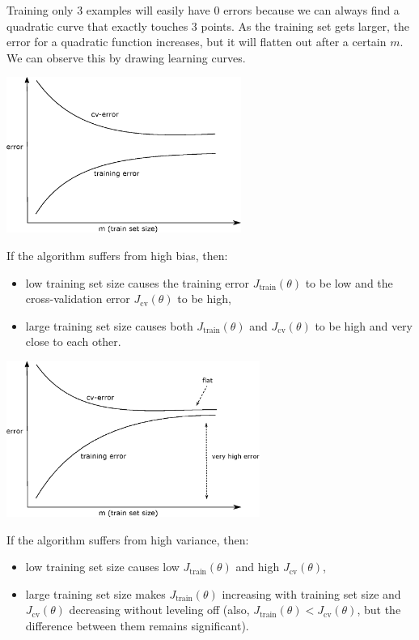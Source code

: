 \documentclass[a4paper,11pt]{report}
\begin{document}
Training only 3 examples will easily have 0 errors because we can always find a quadratic curve that exactly touches 3 points. As the training set gets larger, the error for a quadratic function increases, but it will flatten  out after a certain $m$. We can observe this by drawing learning curves.
\begin{center}
\includegraphics[height = 2in]{Images/learn_curve}
\end{center}

If the algorithm suffers from high bias, then:
\begin{itemize}
  \item low training set size causes the training error $J_\textrm{train}(\theta)$ to be low and the cross-validation error $J_\textrm{cv}(\theta)$ to be high,
  \item large training set size causes both $J_\textrm{train}(\theta)$ and $J_\textrm{cv}(\theta)$ to be high and very close to each other.
\end{itemize}

\begin{center}
\includegraphics[height = 2in]{Images/learn_curve_bias}
\end{center}

If the algorithm suffers from high variance, then:
\begin{itemize}
\item low training set size causes low $J_\textrm{train}(\theta)$ and high $J_\textrm{cv}(\theta)$,
\item large training set size makes $J_\textrm{train}(\theta)$ increasing with training set size and $J_\textrm{cv}(\theta)$ decreasing without leveling off (also, $J_\textrm{train}(\theta) < J_\textrm{cv}(\theta)$, but the difference between them remains significant).
\end{itemize}
\end{document}
